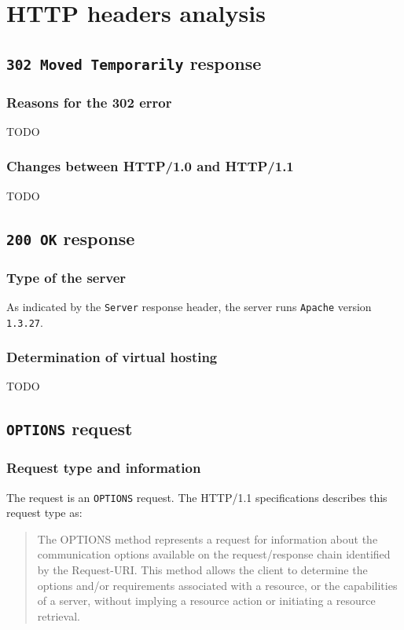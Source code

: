 \section{HTTP headers analysis}

\subsection{\texttt{302 Moved Temporarily} response}

\subsubsection{Reasons for the 302 error}
TODO

\subsubsection{Changes between HTTP/1.0 and HTTP/1.1}
TODO



\subsection{\texttt{200 OK} response}

\subsubsection{Type of the server}

As indicated by the {\tt Server} response header, the server runs {\tt Apache} version {\tt 1.3.27}.

\subsubsection{Determination of virtual hosting}
TODO



\subsection{\texttt{OPTIONS} request}

\subsubsection{Request type and information}

The request is an {\tt OPTIONS} request. The HTTP/1.1 specifications describes this request type as:

\begin{quote}
The OPTIONS method represents a request for information about the communication options available on the request/response chain identified by the Request-URI. This method allows the client to determine the options and/or requirements associated with a resource, or the capabilities of a server, without implying a resource action or initiating a resource retrieval.
\end{quote}

